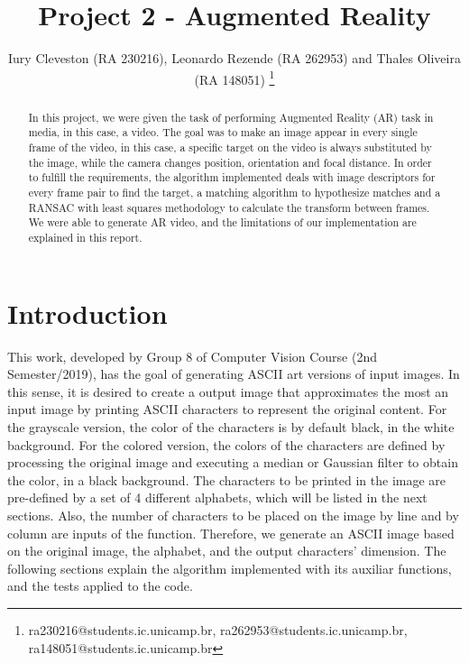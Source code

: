 \documentclass[]{IEEEtran}
\begin{document}
  \title{Project 2 - Augmented Reality}
  \author{Iury Cleveston (RA 230216), Leonardo Rezende (RA 262953) and Thales Oliveira (RA 148051)
    \thanks{ra230216@students.ic.unicamp.br, ra262953@students.ic.unicamp.br, ra148051@students.ic.unicamp.br}
  }
  \maketitle
  
  \begin{abstract}
    In this project, we were given the task of performing Augmented Reality (AR) task in media, in this case, a video. The goal was to make an image appear in every single frame of the video, in this case, a specific target on the video is always substituted by the image, while the camera changes position, orientation and focal distance. In order to fulfill the requirements, the algorithm implemented deals with image descriptors for every frame pair to find the target, a matching algorithm to hypothesize matches and a RANSAC with least squares methodology to calculate the transform between frames. We were able to generate AR video, and the limitations of our implementation are explained in this report.
  \end{abstract}
  
\section{Introduction}
This work, developed by Group 8 of Computer Vision Course (2nd Semester/2019), has the goal of generating ASCII art versions of input images. In this sense, it is desired to create a output image that approximates the most an input image by printing ASCII characters to represent the original content. For the grayscale version, the color of the characters is by default black, in the white background. For the colored version, the colors of the characters are defined by processing the original image and executing a median or Gaussian filter to obtain the color, in a black background. The characters to be printed in the image are pre-defined by a set of 4 different alphabets, which will be listed in the next sections. Also, the number of characters to be placed on the image by line and by column are inputs of the function. Therefore, we generate an ASCII image based on the original image, the alphabet, and the output characters' dimension. The following sections explain the algorithm implemented with its auxiliar functions, and the tests applied to the code.  
\end{document}
